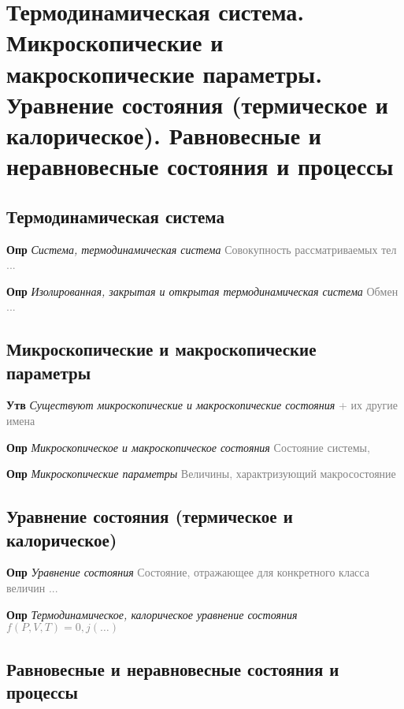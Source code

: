 \documentclass[a4paper, 14pt]{article}
\begin{document}
    \tableofcontents \newpage

    \section{Термодинамическая система.
    Микроскопические и макроскопические параметры.
    Уравнение состояния (термическое и калорическое).
    Равновесные и неравновесные состояния и процессы}

    \subsection{Термодинамическая система}

    \textbf{Опр} \textit{Система, термодинамическая система} \textcolor{gray}{Совокупность рассматриваемых тел ...}

    \textbf{Опр} \textit{Изолированная, закрытая и открытая термодинамическая система} \textcolor{gray}{Обмен ...}

    \subsection{Микроскопические и макроскопические параметры}

    \textbf{Утв} \textit{Существуют микроскопические и макроскопические состояния} \textcolor{gray}{+ их другие имена}

    \textbf{Опр} \textit{Микроскопическое и макроскопическое состояния} \textcolor{gray}{Состояние системы,}

    \textbf{Опр} \textit{Микроскопические параметры} \textcolor{gray}{Величины, характризующий макросостояние}

    \subsection{Уравнение состояния (термическое и калорическое)}

    \textbf{Опр} \textit{Уравнение состояния} \textcolor{gray}{Состояние, отражающее для конкретного класса величин ...}

    \textbf{Опр} \textit{Термодинамическое, калорическое уравнение состояния} \textcolor{gray}{$f(P, V, T) = 0, j(\dots)$}

    \subsection{Равновесные и неравновесные состояния и процессы}
\end{document}
